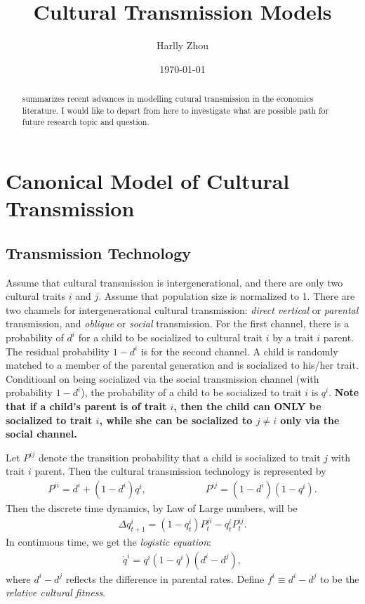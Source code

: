 \documentclass[12pt]{article}
\begin{document}
\begin{titlepage}
\title{Cultural Transmission Models}
\author{Harlly Zhou}
\date{\today}
\maketitle
\begin{abstract}
\noindent
\cite{bisinEconomicModelsCultural2025} summarizes recent advances in modelling cutural transmission in the economics literature. I would like to depart from here to investigate what are possible path for future research topic and question.
\bigskip
\end{abstract}
\setcounter{page}{0}
\thispagestyle{empty}
\end{titlepage}
\pagebreak \newpage

\section{Canonical Model of Cultural Transmission}
\subsection{Transmission Technology}
Assume that cultural transmission is intergenerational, and there are only two cultural traits $i$ and $j$. Assume that population size is normalized to 1. There are two channels for intergenerational cultural transmission: \textit{direct vertical} or \textit{parental} transmission, and \textit{oblique} or \textit{social} transmission. For the first channel, there is a probability of $d^i$ for a child to be socialized to cultural trait $i$ by a trait $i$ parent. The residual probability $1-d^i$ is for the second channel. A child is randomly matched to a member of the parental generation and is socialized to his/her trait. Conditioanl on being socialized via the social transmission channel (with probability $1-d^i$), the probability of a child to be socialized to trait $i$ is $q^i$. \textbf{Note that if a child's parent is of trait $i$, then the child can ONLY be socialized to trait $i$, while she can be socialized to $j\neq i$ only via the social channel.}

Let $P^{ij}$ denote the transition probability that a child is socialized to trait $j$ with trait $i$ parent. Then the cultural transmission technology is represented by
\begin{align}
    P^{ii} = d^i + (1-d^i)q^i,\qquad \qquad \qquad P^{ij} = (1-d^i)(1-q^i).\label{eq:inter_transition_prob}
\end{align}
Then the discrete time dynamics, by Law of Large numbers, will be
\begin{align*}
    \Delta q_{t+1}^{i} = (1-q_t^i)P_t^{ji} - q_t^i P_t^{ij}.
\end{align*}
In continuous time, we get the \textit{logistic equation}:
\begin{align}
    \dot{q}^i = q^i (1-q^i) (d^i-d^j),\label{eq:logistic_eq}
\end{align}
where $d^i-d^j$ reflects the difference in parental rates. Define $f^i\equiv d^i - d^j$ to be the \textit{relative cultural fitness}.
\end{document}
